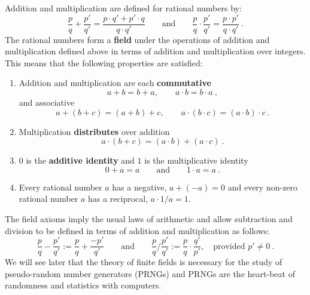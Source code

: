 Addition and multiplication are defined for rational numbers by:
\[
\frac{p}{q} + \frac{p'}{q'} = \frac{p \cdot q' + p' \cdot q}{q \cdot q'}
\qquad \text{and} \qquad \frac{p}{q} \cdot \frac{p'}{q'} = \frac{p \cdot p'}{q \cdot q'} \ .
\]
The rational numbers form a {\bf field} under the operations of addition and multiplication defined above in terms of addition and multiplication over integers.  This means that the following properties are satisfied:
\begin{enumerate}
\item Addition and multiplication are each {\bf commutative} 
\[ a+b = b+a, \qquad a \cdot b = b \cdot a \ , \]
and associative
\[
a + (b + c) = (a + b) + c, \qquad a \cdot (b \cdot c) = (a \cdot b) \cdot c \ .
\]
\item Multiplication {\bf distributes} over addition
\[
a \cdot (b+c) = (a \cdot b) + (a \cdot c) \ .
\]
\item $0$ is the {\bf additive identity} and $1$ is the multiplicative identity
\[
0+a=a \qquad \text{and} \qquad 1 \cdot a = a \ .
\]
\item Every rational number $a$ has a negative, $a+(-a)=0$ and every non-zero rational number $a$ has a reciprocal, $a \cdot 1/a = 1$.
\end{enumerate} 
The field axioms imply the usual laws of arithmetic and allow subtraction and division to be defined in terms of addition and multiplication as follows:
\[
\frac{p}{q} - \frac{p'}{q'} := \frac{p}{q} + \frac{-p'}{q'}
\qquad \text{and} \qquad  \frac{p}{q} / \frac{p'}{q'} := \frac{p}{q} \cdot \frac{q'}{p'}, \quad \text{provided $p' \neq 0$} \ .
\]
We will see later that the theory of finite fields is necessary for the study of pseudo-random number generators (PRNGs) and PRNGs are the heart-beat of randomness and statistics with computers.  


